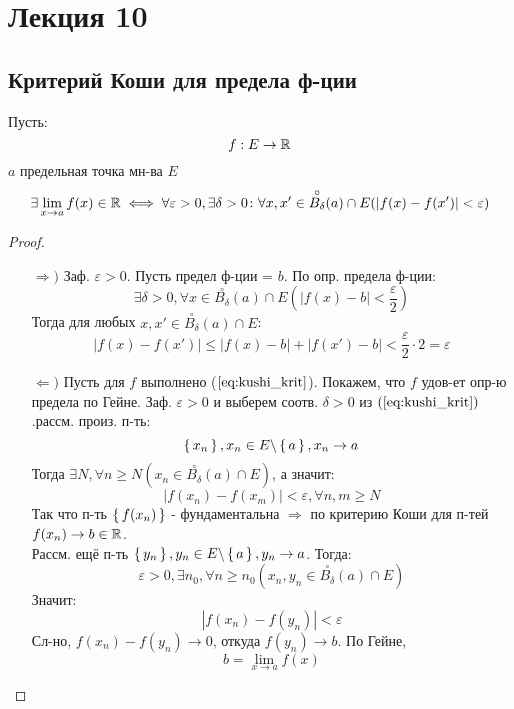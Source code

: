 \section{Лекция 10}
\subsection{Критерий Коши для предела ф-ции}
\begin{theorem}
Пусть:
\[
f: E \rightarrow \mathbb{R}
\]
$a$ предельная точка мн-ва $E$ \\
\begin{equation}
  \label{eq:kushi_krit}
\exists \lim_{x\to a} f(x) \in \mathbb{R} \iff \forall \varepsilon > 0, \exists \delta > 0 \colon \forall x, x' \in \overset{\circ}{B_{\delta}}(a) \cap E (\left|f(x) - f(x')\right| < \varepsilon)
\end{equation}
\end{theorem}
\begin{proof}
  ~\newline
  \begin{itemize}
    \item [$\Rightarrow)$] Заф. $\varepsilon > 0$. Пусть предел ф-ции = $b$. По опр. предела ф-ции:
      \[
        \exists \delta > 0, \forall x \in \overset{\circ}{B_{\delta}}(a) \cap E (\left|f(x) - b\right| < \frac{\varepsilon}{2})
      \]
      Тогда для любых $x, x' \in \overset{\circ}{B_{\delta}}(a) \cap E$:
      \[
      \left|f(x) - f(x')\right| \leq \left|f(x) - b\right| + \left|f(x') - b\right| < \frac{\varepsilon}{2} \cdot 2 = \varepsilon
      \]
  \item [$\Leftarrow)$] Пусть для $f$ выполнено ($\ref{eq:kushi_krit}$). Покажем, что $f$ удов-ет опр-ю предела по Гейне. Заф. $\varepsilon > 0$ и выберем соотв. $\delta > 0$ из $(\ref{eq:kushi_krit})$.рассм. произ. п-ть:
    \[
      \set{x_n}, x_n \in E \backslash \set{a}, x_n \rightarrow a
    \]
    Тогда $\exists N, \forall n \geq N (x_n \in \overset{\circ}{B_{\delta}}(a) \cap E)$, а значит:
    \[
    \left|f(x_n) - f(x_m)\right| < \varepsilon, \forall n, m \geq N
    \]
    Так что п-ть $\set{f(x_n)}$ - фундаментальна $\Rightarrow$ по критерию Коши для п-тей $f(x_n) \rightarrow b \in \mathbb{R}$. \\
    Рассм. ещё п-ть $\set{y_n}, y_n \in E \backslash \set{a}, y_n \rightarrow a$. Тогда:
    \[
      \varepsilon > 0, \exists n_0, \forall n \geq n_0 (x_n, y_n \in \overset{\circ}{B_{\delta}}(a) \cap E)
    \]
    Значит:
    \[
    \left|f(x_n) - f(y_n)\right| < \varepsilon
    \]
    Сл-но, $f(x_n) - f(y_n) \rightarrow 0$, откуда $f(y_n) \rightarrow b$. По Гейне, \[
    b = \lim_{x\to a} f(x)
    \]
  \end{itemize}
\end{proof}

